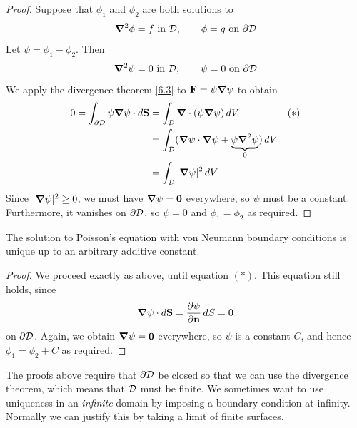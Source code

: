\documentclass{../template/note}
\begin{document}
    \begin{proof}
        Suppose that \(\phi_1\) and \(\phi_2\) are both solutions to
        \begin{align*}
            \grad^2\phi = f \text{ in } \mc D, \qquad \phi = g \text{ on } \pr \mc D
        \end{align*}
        Let \(\psi = \phi_1 - \phi_2\). Then
        \begin{align*}
            \grad^2\psi = 0 \text{ in } \mc D, \qquad \psi = 0 \text{ on } \pr \mc D
        \end{align*}
        We apply the divergence theorem \ref{6.3} to \(\V F = \psi \grad \psi\) to obtain
        \begin{align*}
            0 = \int_{\pr\mc D} \psi \grad \psi \cdot d\V S &= \int_{\mc D} \div(\psi \grad \psi) \D V && (*) \\
            &= \int_{\mc D} (\grad \psi \cdot \grad \psi + \underbrace{\psi \grad^2 \psi}_0) \D V \\
            &= \int_{\mc D} |\grad \psi|^2 \D V
        \end{align*}
        Since \(|\grad \psi|^2 \geq 0\), we must have \(\grad \psi = \V 0\) everywhere, so \(\psi\) must be a constant. Furthermore, it vanishes on \(\partial \mathcal{D}\), so \(\psi = 0\) and \(\phi_1 = \phi_2\) as required.
    \end{proof}
    
    \begin{proposition*}
        The solution to Poisson's equation with von Neumann boundary conditions is unique up to an arbitrary additive constant.
    \end{proposition*}
    
    \begin{proof}
        We proceed exactly as above, until equation \((*)\). This equation still holds, since
        \begin{align*}
            \grad \psi \cdot d \V S = \pd{\psi}{\V n}\D S = 0
        \end{align*}
        on \(\partial \mathcal{D}\). Again, we obtain \(\grad \psi = \V 0\) everywhere, so \(\psi\) is a constant \(C\), and hence \(\phi_1 = \phi_2 + C\) as required.        
    \end{proof}
    
    \begin{remark*}
        The proofs above require that \(\partial \mathcal{D}\) be closed so that we can use the divergence theorem, which means that \(\mathcal{D}\) must be finite. We sometimes want to use uniqueness in an \emph{infinite} domain by imposing a boundary condition at infinity. Normally we can justify this by taking a limit of finite surfaces.
    \end{remark*}
    
\end{document}
